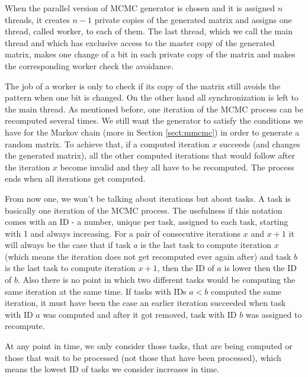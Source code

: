 When the parallel version of MCMC generator is chosen and it is assigned $n$ threads, it creates $n-1$ private copies of the generated matrix and assigns one thread, called worker, to each of them. The last thread, which we call the main thread and which has exclusive access to the master copy of the generated matrix, makes one change of a bit in each private copy of the matrix and makes the corresponding worker check the avoidance.

The job of a worker is only to check if its copy of the matrix still avoids the pattern when one bit is changed. On the other hand all synchronization is left to the main thread. As mentioned before, one iteration of the MCMC process can be recomputed several times. We still want the generator to satisfy the conditions we have for the Markov chain (more in Section \ref{sect:mmcmc}) in order to generate a random matrix. To achieve that, if a computed iteration $x$ succeeds (and changes the generated matrix), all the other computed iterations that would follow after the iteration $x$ become invalid and they all have to be recomputed. The process ends when all iterations get computed.

From now one, we won't be talking about iterations but about tasks. A task is basically one iteration of the MCMC process. The usefulness if this notation comes with an ID - a number, unique per task, assigned to each task, starting with 1 and always increasing. For a pair of consecutive iterations $x$ and $x+1$ it will always be the case that if task $a$ is the last task to compute iteration $x$ (which means the iteration does not get recomputed ever again after) and task $b$ is the last task to compute iteration $x+1$, then the ID of $a$ is lower then the ID of $b$. Also there is no point in which two different tasks would be computing the same iteration at the same time. If tasks with IDs $a<b$ computed the same iteration, it must have been the case an earlier iteration succeeded when task with ID $a$ was computed and after it got removed, task with ID $b$ was assigned to recompute.

At any point in time, we only consider those tasks, that are being computed or those that wait to be processed (not those that have been processed), which means the lowest ID of tasks we consider increases in time.

